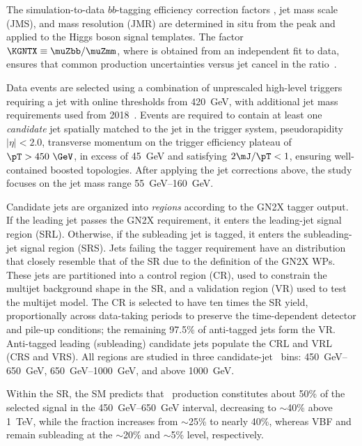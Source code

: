 \documentclass[PAPER, cernpreprint=true, atlasdraft=false, UKenglish, texmf, orcidlogo]{atlasdoc}
\begin{document}
The simulation-to-data $bb$-tagging efficiency correction factors \KGNTX, jet mass scale (JMS), and mass resolution (JMR) are determined in situ from the \Zbb peak and applied to the Higgs boson signal templates.
The factor $\KGNTX \equiv \muZbb/\muZmm$, where \muZmm is obtained from an independent fit to \Zmmjets data, ensures that common \Zjets production uncertainties versus jet \pT cancel in the ratio~\cite{ATL-PHYS-PUB-2021-035}.

Data events are selected using a combination of unprescaled high-level triggers requiring a jet with online \pT thresholds from 420~GeV, with additional jet mass requirements used from 2018~\cite{TRIG-2019-04,TRIG-2022-01}.
Events are required to contain at least one \textit{candidate} jet spatially matched to the jet in the trigger system, pseudorapidity $|\eta|<2.0$, transverse momentum on the trigger efficiency plateau of $\pT>450~\GeV$, \mJ in excess of \SI{45}{\GeV} and satisfying $2\mJ/\pT < 1$, ensuring well-contained boosted topologies. After applying the jet corrections above, the study focuses on the jet mass range \SIrange{55}{160}{\GeV}.

Candidate jets are organized into \textit{regions} according to the GN2X tagger output.
If the leading jet passes the GN2X requirement, it enters the leading-jet signal region (SRL).
Otherwise, if the subleading jet is tagged, it enters the subleading-jet signal region (SRS).
Jets failing the tagger requirement have an \mJ distribution that closely resemble that of the SR due to the definition of the GN2X WPs.
These jets are partitioned into a control region (CR), used to constrain the multijet background shape in the SR, and a validation region (VR) used to test the multijet model.
The CR is selected to have ten times the SR yield, proportionally across data-taking periods to preserve the time-dependent detector and pile-up conditions; the remaining 97.5\% of anti-tagged jets form the VR.
Anti-tagged leading (subleading) candidate jets populate the CRL and VRL (CRS and VRS).
All regions are studied in three candidate-jet \pT\ bins: \SIrange{450}{650}{\GeV}, \SIrange{650}{1000}{\GeV}, and above \SI{1000}{\GeV}.

Within the SR, the SM predicts that \ggF\ production constitutes about 50\% of the selected signal in the \SIrange{450}{650}{GeV} \pT interval, decreasing to $\sim$40\% above \SI{1}{TeV}, while the \VH fraction increases from $\sim$25\% to nearly 40\%, whereas VBF and \ttH remain subleading at the $\sim$20\% and $\sim$5\% level, respectively.
\end{document}
